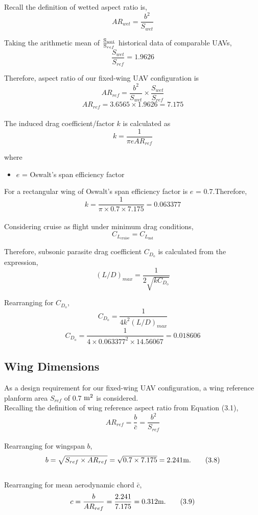 \documentclass[12 pt]{article}
\begin{document}
Recall the definition of wetted aspect ratio is,
\[{AR}_{wet} = \frac{b^2}{S_{wet}}\tag{3.3}\]

Taking the arithmetic mean of ${\frac {\text S_{wet}}{\text S_{ref}}}$ historical data of comparable UAVs, $${\frac {S_{wet}}{S_{ref}}} = 1.9626 $$

Therefore, aspect ratio of our fixed-wing UAV configuration is
\[{AR}_{ref} = \frac{b^2}{S_{wet}} \times \frac {S_{wet}}{S_{ref}}\tag{3.4}\]
\[{AR}_{ref} = 3.6565 \times 1.9626 = 7.175 \]\\

The induced drag coefficient/factor ${k}$ is calculated as
\[{k} = \frac{1}{\pi e {AR}_{ref} }\tag{3.5}\]

where
\begin{itemize}
\item[] ${e}$ = Oswalt's span efficiency factor\\
\end{itemize}

For a rectangular wing of Oswalt's span efficiency factor is ${e}$ = 
0.7.Therefore, 
\[{k} = \frac{1}{\pi \times 0.7 \times 7.175} = 0.063377\]\\

Considering cruise as flight under minimum drag conditions, $$C_{L_{\text{cruise}}} =C_{L_{\text{md}}}$$

Therefore, subsonic parasite drag coefficient $C_{D_{\text{o}}}$ is calculated from the expression,
\[{{(L/D)}_{max}} = \frac{1}{2\sqrt{kC_{D_{\text{o}}}}}\tag{3.6}\]

Rearranging for $C_{D_{\text{o}}}$,
\[C_{D_{\text{o}}} = \frac{1}{4{k}^{2}{{(L/D)}_{max}}} \tag{3.7}\]
\[C_{D_{\text{o}}} = \frac{1}{4\times{0.063377}^{2}\times14.56067} = 0.018606\]
\subsection{{Wing Dimensions}}
As a design requirement for our fixed-wing UAV configuration, a wing reference planform area ${S_{ref}}$ of 0.7 $\text m^2$ is considered.\\

Recalling the definition of wing reference aspect ratio from Equation (3.1), 
\[ {AR}_{ref} = \frac {b}{\bar c} =\frac {b^2}{S_{ref}} \]\\
\indent Rearranging for wingspan $b$,
\[ b = \sqrt{{S_{ref}} \times {AR}_{ref}} = \sqrt{0.7 \times 7.175} = 2.241 {\text m.}\tag{3.8}\]\\
\indent Rearranging for mean aerodynamic chord ${\bar c}$,
\[c = \frac{b}{{AR}_{ref}} = \frac{2.241}{7.175} = 0.312 {\text m.}\tag{3.9} \]
\end{document}
